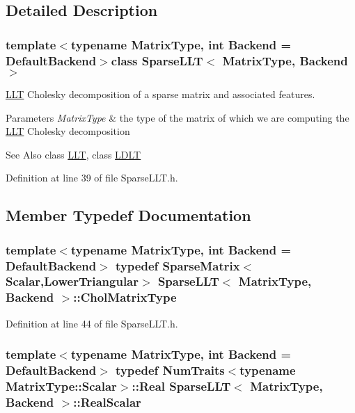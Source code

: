 \subsection{Detailed Description}
\subsubsection*{template$<$typename Matrix\-Type, int Backend = Default\-Backend$>$class Sparse\-L\-L\-T$<$ Matrix\-Type, Backend $>$}

\hyperlink{class_l_l_t}{L\-L\-T} Cholesky decomposition of a sparse matrix and associated features. 


\begin{DoxyParams}{Parameters}
{\em Matrix\-Type} & the type of the matrix of which we are computing the \hyperlink{class_l_l_t}{L\-L\-T} Cholesky decomposition\\
\hline
\end{DoxyParams}
\begin{DoxySeeAlso}{See Also}
class \hyperlink{class_l_l_t}{L\-L\-T}, class \hyperlink{class_l_d_l_t}{L\-D\-L\-T} 
\end{DoxySeeAlso}


Definition at line 39 of file Sparse\-L\-L\-T.\-h.



\subsection{Member Typedef Documentation}
\hypertarget{class_sparse_l_l_t_a2c9d9dfe18d1e70b0f46de8c9d106bf2}{
\subsubsection[{Chol\-Matrix\-Type}]{\setlength{\rightskip}{0pt plus 5cm}template$<$typename Matrix\-Type, int Backend = Default\-Backend$>$ typedef {\bf Sparse\-Matrix}$<${\bf Scalar},{\bf Lower\-Triangular}$>$ {\bf Sparse\-L\-L\-T}$<$ Matrix\-Type, Backend $>$\-::{\bf Chol\-Matrix\-Type}\hspace{0.3cm}{\ttfamily [protected]}}}\label{class_sparse_l_l_t_a2c9d9dfe18d1e70b0f46de8c9d106bf2}


Definition at line 44 of file Sparse\-L\-L\-T.\-h.

\hypertarget{class_sparse_l_l_t_a20661706ee54d830837a844d675fb236}{
\subsubsection[{Real\-Scalar}]{\setlength{\rightskip}{0pt plus 5cm}template$<$typename Matrix\-Type, int Backend = Default\-Backend$>$ typedef {\bf Num\-Traits}$<$typename Matrix\-Type\-::\-Scalar$>$\-::Real {\bf Sparse\-L\-L\-T}$<$ Matrix\-Type, Backend $>$\-::{\bf Real\-Scalar}\hspace{0.3cm}{\ttfamily [protected]}}}\label{class_sparse_l_l_t_a20661706ee54d830837a844d675fb236}


